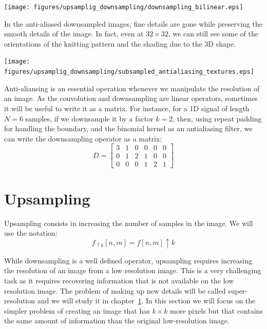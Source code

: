 \begin{center}
  \texttt{[image: figures/upsamplig\_downsampling/downsampling\_bilinear.eps]}
\end{center}


In the anti-aliased downsampled images, fine details are gone while preserving the smooth details of the image. In fact, even at $32 \times 32$, we can still see some of the orientations of the knitting pattern and the shading due to the 3D shape.

\begin{center}
  \texttt{[image: figures/upsamplig\_downsampling/subsampled\_antialiasing\_textures.eps]}
\end{center}

Anti-aliansing is an essential operation whenever we manipulate the resolution of an image.
As the convolution and downsampling are linear operators, sometimes it will be useful to write it as a matrix. For instance, for a 1D signal of length $N=6$  samples, if we downsample it by a factor $k=2$, then, using repeat padding for handling the boundary, and the binomial kernel as an antialiasing filter, we can write the downsampling operator as a matrix:
\begin{equation}
  D = \left[
    \begin{array}{cccccc}
      3 & 1 & 0 & 0 & 0 & 0 \\
      0 & 1 & 2 & 1 & 0 & 0 \\
      0 & 0 & 0 & 1 & 2 & 1
    \end{array}
    \right]
\end{equation}



\section{Upsampling}

Upsampling consists in increasing the number of samples in the image. We will use the notation:
\begin{equation}
  f_{\uparrow k} \left[n,m\right]  = f\left[n,m\right] \uparrow k
\end{equation}

While downsampling is a well defined operator, upsampling requires increasing the resolution of an image from a low resolution image. This is a very challenging task as it requires recovering information that is not available on the low resolution image. The problem of making up new details will be called super-resolution and we will study it in chapter~\ref{}.  In this section we will focus on the simpler problem of creating an image that has $k \times k$ more pixels but that contains the same amount of information than the original low-resolution image.

